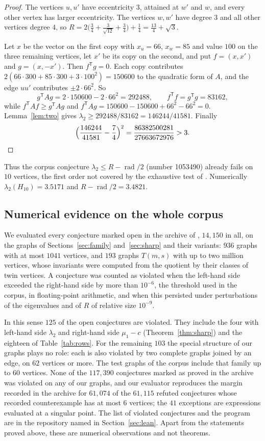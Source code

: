 \documentclass[11pt]{amsart}
\theoremstyle{definition}
\theoremstyle{remark}
\newcommand{\rad}{\operatorname{rad}}
\newcommand{\tr}{^{\mathsf{T}}}
\begin{document}
\begin{proof}
The vertices $u,u'$ have eccentricity $3$, attained at $w'$ and $w$, and every other vertex has
larger eccentricity. The vertices $w,w'$ have degree $3$ and all other vertices degree $4$, so
$R=2\bigl(\frac34+\frac{3}{\sqrt{12}}+\frac34\bigr)+\frac14=\frac{13}{4}+\sqrt3$.

Let $x$ be the vector on the first copy with $x_u=66$, $x_w=85$ and value $100$ on the three
remaining vertices, let $x'$ be its copy on the second, and put $f=(x,x')$ and $g=(x,-x')$.
Then $f\tr g=0$. Each copy contributes $2(66\cdot300+85\cdot300+3\cdot100^2)=150600$ to the
quadratic form of $A$, and the edge $uu'$ contributes $\pm2\cdot66^2$. So
\[
g\tr Ag=2\cdot150600-2\cdot66^2=292488,\qquad f\tr f=g\tr g=83162,
\]
while $f\tr Af\ge g\tr Ag$ and $f\tr Ag=150600-150600+66^2-66^2=0$. Lemma~\ref{lem:two} gives
$\lambda_2\ge292488/83162=146244/41581$. Finally
\[
\Bigl(\frac{146244}{41581}-\frac74\Bigr)^2=\frac{86382500281}{27663672976}>3 .\qedhere
\]
\end{proof}

Thus the corpus conjecture $\lambda_2\le R-\rad/2$ (number 1053490) already fails on $10$
vertices, the first order not covered by the exhaustive test of \cite{Cazenave}. Numerically
$\lambda_2(H_{10})=3.5171$ and $R-\rad/2=3.4821$.

\subsection{Numerical evidence on the whole corpus}
We evaluated every conjecture marked open in the archive of \cite{Cazenave}, $14{,}150$ in all,
on the graphs of Sections~\ref{sec:family} and~\ref{sec:sharp} and their variants: $936$ graphs
with at most $1041$ vertices, and $193$ graphs $T(m,s)$ with up to two million vertices, whose
invariants were computed from the quotient by their classes of twin vertices. A conjecture was
counted as violated when the left-hand side exceeded the right-hand side by more than
$10^{-6}$, the threshold used in the corpus, in floating-point arithmetic, and when this
persisted under perturbations of the eigenvalues and of $R$ of relative size $10^{-9}$.

In this sense $125$ of the open conjectures are violated. They include the four with left-hand
side $\lambda_2$ and right-hand side $\mu_1-c$ (Theorem~\ref{thm:sharp}) and the eighteen of
Table~\ref{tab:rows}. For the remaining $103$ the special structure of our graphs plays no
role: each is also violated by two complete graphs joined by an edge, on $62$ vertices or more.
The test graphs of the corpus include that family up to $60$ vertices. None of the $117{,}390$
conjectures marked as proved in the archive was violated on any of our graphs, and our
evaluator reproduces the margin recorded in the archive for $61{,}074$ of the $61{,}115$ refuted
conjectures whose recorded counterexample has at most $6$ vertices; the $41$ exceptions are
expressions evaluated at a singular point. The list of violated conjectures and the program
are in the repository named in Section~\ref{sec:lean}. Apart from the statements proved above,
these are numerical observations and not theorems.
\end{document}
